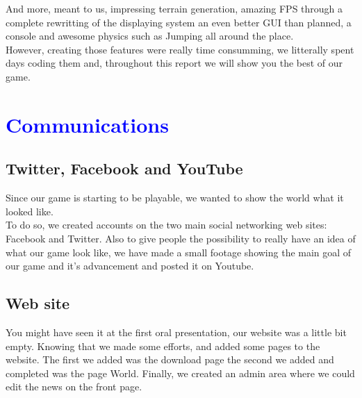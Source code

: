 \documentclass[article]{report}             %
\begin{document}
 			And more, meant to us, impressing terrain generation, amazing FPS through a complete rewritting of the displaying system an even better GUI than planned, a console and awesome physics such as Jumping all around the place. \\

 			However, creating those features were really time consumming, we litterally spent days coding them and, throughout this report we will show you the best of our game.
  		\chapter{\textcolor{blue}{Communications}}
			\section{Twitter, Facebook and YouTube }
				Since our game is starting to be playable, we wanted to show the world what it looked like.\\
				To do so, we created accounts on the two main social networking web sites: Facebook and Twitter. Also to give people the possibility to really have an idea of what our game look like, we have made a small footage showing the main goal of our game and it's advancement and posted it on Youtube.
				
			\section{Web site}
				You might have seen it at the first oral presentation, our website was a little bit empty. Knowing that we made some efforts, and added some pages to the website. The first we added was the download page the second we added and completed was the page World. Finally, we created an admin area where we could edit the news on the front page.
\end{document}
